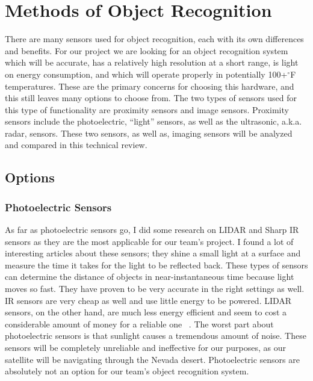 \documentclass[10pt,letterpaper,onecolumn,journal]{IEEEtran}
\begin{document}
\section{Methods of Object Recognition}
There are many sensors used for object recognition, each with its own differences and benefits. For our project we are looking for an object recognition system which will be accurate, has a relatively high resolution at a short range, is light on energy consumption, and which will operate properly in potentially 100+$^{\circ}$F temperatures. These are the primary concerns for choosing this hardware, and this still leaves many options to choose from. The two types of sensors used for this type of functionality are proximity sensors and image sensors. Proximity sensors include the photoelectric, “light” sensors, as well as the ultrasonic, a.k.a. radar, sensors. These two sensors, as well as, imaging sensors will be analyzed and compared in this technical review.

\subsection{Options}
\subsubsection{Photoelectric Sensors}
As far as photoelectric sensors go, I did some research on LIDAR and Sharp IR sensors as they are the most applicable for our team’s project. I found a lot of interesting articles about these sensors; they shine a small light at a surface and measure the time it takes for the light to be reflected back. These types of sensors can determine the distance of objects in near-instantaneous time because light moves so fast. They have proven to be very accurate in the right settings as well. IR sensors are very cheap as well and use little energy to be powered. LIDAR sensors, on the other hand, are much less energy efficient and seem to cost a considerable amount of money for a reliable one ~\cite{lidar2016}. The worst part about photoelectric sensors is that sunlight causes a tremendous amount of noise. These sensors will be completely unreliable and ineffective for our purposes, as our satellite will be navigating through the Nevada desert. Photoelectric sensors are absolutely not an option for our team’s object recognition system.
\end{document}

